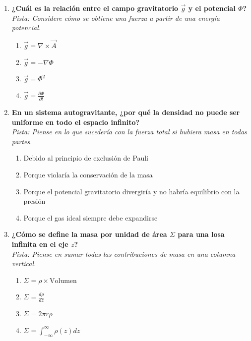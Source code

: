\documentclass[12pt,a4paper]{article}
\begin{document}
\begin{enumerate}[label=\textbf{\arabic*.}, itemsep=1.5em]
\item \textbf{¿Cuál es la relación entre el campo gravitatorio $\vec{g}$ y el potencial $\Phi$?} \\
\textit{Pista: Considere cómo se obtiene una fuerza a partir de una energía potencial.}
\begin{enumerate}[label=\alph*), leftmargin=*]
    \item $\vec{g} = \nabla \times \vec{A}$
    \item $\vec{g} = -\nabla \Phi$
    \item $\vec{g} = \Phi^2$
    \item $\vec{g} = \frac{\partial \Phi}{\partial t}$
\end{enumerate}

\item \textbf{En un sistema autogravitante, ¿por qué la densidad no puede ser uniforme en todo el espacio infinito?} \\
\textit{Pista: Piense en lo que sucedería con la fuerza total si hubiera masa en todas partes.}
\begin{enumerate}[label=\alph*), leftmargin=*]
    \item Debido al principio de exclusión de Pauli
    \item Porque violaría la conservación de la masa
    \item Porque el potencial gravitatorio divergiría y no habría equilibrio con la presión
    \item Porque el gas ideal siempre debe expandirse
\end{enumerate}

\item \textbf{¿Cómo se define la masa por unidad de área $\Sigma$ para una losa infinita en el eje $z$?} \\
\textit{Pista: Piense en sumar todas las contribuciones de masa en una columna vertical.}
\begin{enumerate}[label=\alph*), leftmargin=*]
    \item $\Sigma = \rho \times \text{Volumen}$
    \item $\Sigma = \frac{d\rho}{dz}$
    \item $\Sigma = 2\pi r \rho$
    \item $\Sigma = \int_{-\infty}^{\infty} \rho(z) dz$
\end{enumerate}


\end{enumerate}
\end{document}
